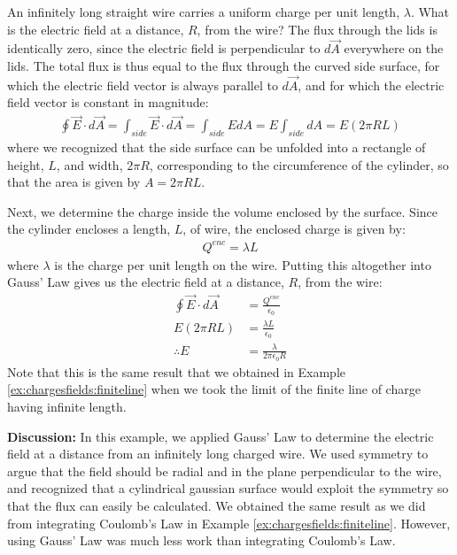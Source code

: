 \begin{example}{An infinitely long straight wire carries a uniform charge per unit length, $\lambda$. What is the electric field at a distance, $R$, from the wire?}
The flux through the lids is identically zero, since the electric field is perpendicular to $d\vec A$ everywhere on the lids. The total flux is thus equal to the flux through the curved side surface, for which the electric field vector is always parallel to $d\vec A$, and for which the electric field vector is constant in magnitude:
\begin{align*}
\oint \vec E\cdot d\vec A = \int_{side} \vec E\cdot d\vec A =\int_{side} EdA=E\int_{side}dA=E(2\pi R L)
\end{align*}
where we recognized that the side surface can be unfolded into a rectangle of height, $L$, and width, $2\pi R$, corresponding to the circumference of the cylinder, so that the area is given by $A=2\pi R L$. 

Next, we determine the charge inside the volume enclosed by the surface. Since the cylinder encloses a length, $L$, of wire, the enclosed charge is given by:
\begin{align*}
Q^{enc}=\lambda L
\end{align*}
where $\lambda$ is the charge per unit length on the wire. Putting this altogether into Gauss' Law gives us the electric field at a distance, $R$, from the wire:
\begin{align*}
\oint \vec E\cdot d\vec A&=\frac{Q^{enc}}{\epsilon_0} \\
E(2\pi R L) &= \frac{\lambda L}{\epsilon_0}\\
\therefore E&= \frac{\lambda}{2\pi\epsilon_0R}
\end{align*}
Note that this is the same result that we obtained in Example \ref{ex:chargesfields:finiteline} when we took the limit of the finite line of charge having infinite length.

\textbf{Discussion: }In this example, we applied Gauss' Law to determine the electric field at a distance from an infinitely long charged wire. We used symmetry to argue that the field should be radial and in the plane perpendicular to the wire, and recognized that a cylindrical gaussian surface would exploit the symmetry so that the flux can easily be calculated. We obtained the same result as we did from integrating Coulomb's Law in Example \ref{ex:chargesfields:finiteline}. However, using Gauss' Law was much less work than integrating Coulomb's Law.

\end{example}


